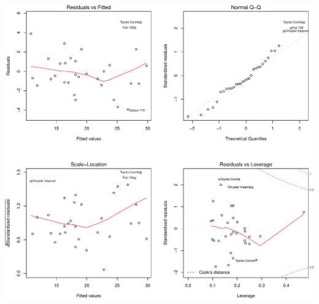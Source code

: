\documentclass[a3paper]{article}
\begin{document}
\includegraphics{./Report_files/figure-latex/unnamed-chunk-15.pdf}
\end{document}
